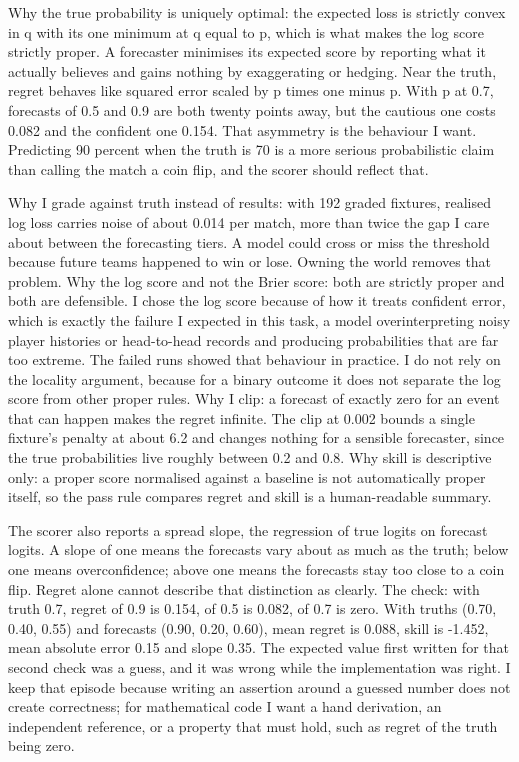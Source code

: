 \documentclass[11pt,letterpaper]{article}
\begin{document}
Why the true probability is uniquely optimal: the expected loss is strictly convex in q with its one minimum at q equal to p, which is what makes the log score strictly proper. A forecaster minimises its expected score by reporting what it actually believes and gains nothing by exaggerating or hedging. Near the truth, regret behaves like squared error scaled by p times one minus p. With p at 0.7, forecasts of 0.5 and 0.9 are both twenty points away, but the cautious one costs 0.082 and the confident one 0.154. That asymmetry is the behaviour I want. Predicting 90 percent when the truth is 70 is a more serious probabilistic claim than calling the match a coin flip, and the scorer should reflect that.


Why I grade against truth instead of results: with 192 graded fixtures, realised log loss carries noise of about 0.014 per match, more than twice the gap I care about between the forecasting tiers. A model could cross or miss the threshold because future teams happened to win or lose. Owning the world removes that problem. Why the log score and not the Brier score: both are strictly proper and both are defensible. I chose the log score because of how it treats confident error, which is exactly the failure I expected in this task, a model overinterpreting noisy player histories or head-to-head records and producing probabilities that are far too extreme. The failed runs showed that behaviour in practice. I do not rely on the locality argument, because for a binary outcome it does not separate the log score from other proper rules. Why I clip: a forecast of exactly zero for an event that can happen makes the regret infinite. The clip at 0.002 bounds a single fixture's penalty at about 6.2 and changes nothing for a sensible forecaster, since the true probabilities live roughly between 0.2 and 0.8. Why skill is descriptive only: a proper score normalised against a baseline is not automatically proper itself, so the pass rule compares regret and skill is a human-readable summary.


The scorer also reports a spread slope, the regression of true logits on forecast logits. A slope of one means the forecasts vary about as much as the truth; below one means overconfidence; above one means the forecasts stay too close to a coin flip. Regret alone cannot describe that distinction as clearly. The check: with truth 0.7, regret of 0.9 is 0.154, of 0.5 is 0.082, of 0.7 is zero. With truths (0.70, 0.40, 0.55) and forecasts (0.90, 0.20, 0.60), mean regret is 0.088, skill is -1.452, mean absolute error 0.15 and slope 0.35. The expected value first written for that second check was a guess, and it was wrong while the implementation was right. I keep that episode because writing an assertion around a guessed number does not create correctness; for mathematical code I want a hand derivation, an independent reference, or a property that must hold, such as regret of the truth being zero.
\end{document}
